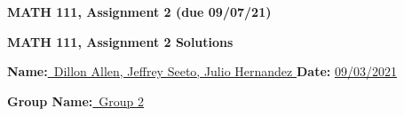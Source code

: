 \documentclass[11pt]{amsart}
\begin{document}
\begin{center}
\textbf{MATH 111, Assignment 2 (due 09/07/21)}%
\end{center}

\vspace{.1in}

\begin{center}
\textbf{MATH 111, Assignment 2 Solutions}%
\end{center}

\vspace{.1 in}

\textbf{Name:}\underline{\ Dillon Allen, Jeffrey Seeto, Julio Hernandez } \hspace{1in} \textbf{Date:} \underline{ 09/03/2021}%

\textbf{Group Name:}\underline{\ Group 2}


\begin{center}
\begin{tabular}{|p{2.5in}|}
\hline

\hline
\end{tabular}
\end{center}

\vspace{.2in}
\end{document}
